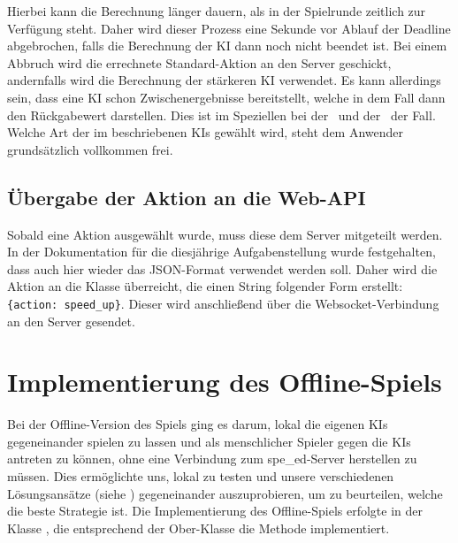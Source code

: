 Hierbei kann die Berechnung länger dauern, als in der Spielrunde zeitlich zur Verfügung steht.
Daher wird dieser Prozess eine Sekunde vor Ablauf der Deadline abgebrochen, falls die Berechnung der \ac{KI} dann noch
nicht beendet ist.
Bei einem Abbruch wird die errechnete Standard-Aktion an den Server geschickt, andernfalls wird die Berechnung der
stärkeren \ac{KI} verwendet.
Es kann allerdings sein, dass eine \ac{KI} schon Zwischenergebnisse bereitstellt, welche in dem Fall dann den
Rückgabewert darstellen.
Dies ist im Speziellen bei der~ und der~
der Fall.
Welche Art der im  beschriebenen \ac{KI}s gewählt wird, steht dem Anwender grundsätzlich
vollkommen frei.

\subsection{Übergabe der Aktion an die Web-API}
\label{subsec:uebergabe-aktion}

Sobald eine Aktion ausgewählt wurde, muss diese dem Server mitgeteilt werden.
In der Dokumentation für die diesjährige Aufgabenstellung  wurde festgehalten, dass auch
hier wieder das JSON-Format verwendet werden soll.
Daher wird die Aktion an die Klasse  überreicht, die einen String folgender Form erstellt:
\texttt{\{\dq action\dq : \dq speed\_up\dq \}}.
Dieser wird anschließend über die Websocket-Verbindung an den Server gesendet.

\section{Implementierung des Offline-Spiels}
\label{sec:offline-implementierung}

Bei der Offline-Version des Spiels ging es darum, lokal die eigenen \ac{KI}s gegeneinander spielen zu lassen und
als menschlicher Spieler gegen die \ac{KI}s antreten zu können, ohne eine Verbindung zum spe\_ed-Server herstellen zu
müssen.
Dies ermöglichte uns, lokal zu testen und unsere verschiedenen Lösungsansätze (siehe )
gegeneinander auszuprobieren, um zu beurteilen, welche die beste Strategie ist.
Die Implementierung des Offline-Spiels erfolgte in der Klasse , die entsprechend der Ober-Klasse
 die Methode  implementiert. \\

